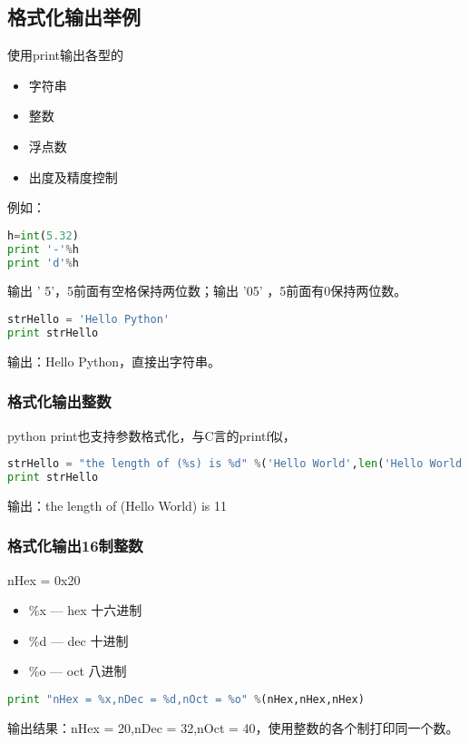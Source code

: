 \subsection{格式化输出举例}
使用print输出各型的
\begin{itemize}
\item 字符串
\item 整数
\item 浮点数
\item 出度及精度控制
\end{itemize}

例如：
\begin{lstlisting}[language=Python]
h=int(5.32)
print '-'%h
print 'd'%h
\end{lstlisting}
输出 ' 5'，5前面有空格保持两位数；输出 '05' ，5前面有0保持两位数。
 
 \begin{lstlisting}[language=Python]
strHello = 'Hello Python' 
print strHello 
\end{lstlisting}
输出：Hello Python，直接出字符串。


\subsubsection{格式化输出整数}
python print也支持参数格式化，与C言的printf似，
 \begin{lstlisting}[language=Python]
strHello = "the length of (%s) is %d" %('Hello World',len('Hello World'))
print strHello
\end{lstlisting}
输出：the length of (Hello World) is 11


\subsubsection{格式化输出16制整数}
nHex = 0x20
\begin{itemize}
\item \%x --- hex 十六进制
\item \%d --- dec 十进制
\item \%o --- oct 八进制
\end{itemize}
 
 \begin{lstlisting}[language=Python]
print "nHex = %x,nDec = %d,nOct = %o" %(nHex,nHex,nHex)
 \end{lstlisting}
输出结果：nHex = 20,nDec = 32,nOct = 40，使用整数的各个制打印同一个数。


